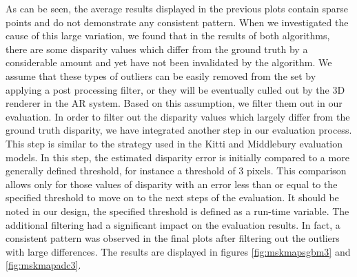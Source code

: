 As can be seen, the average results displayed in the previous plots contain sparse points and 
do not demonstrate any consistent pattern. When we investigated the cause of this large variation, we found that in
the results of both algorithms, there are some disparity values which differ from the ground truth 
by a considerable amount and yet have not been invalidated by the
algorithm. We assume that these types of outliers can be easily removed from the set by applying a post processing filter, or 
they will be eventually culled out by the 3D renderer in the AR system. Based on this assumption, we filter them out in our evaluation.
In order to filter out the disparity values which largely differ from the ground truth disparity, we have integrated another 
step in our evaluation process. This step is similar to the strategy used in the Kitti and Middlebury evaluation models.
In this step, the estimated disparity error is initially compared to a more generally defined threshold, for instance a threshold of 3 pixels.
This comparison allows only for those values of disparity with an error less than or equal to the specified threshold to 
move on to the next steps of the evaluation. It should be noted in our design, the specified threshold is defined as a run-time variable. \newline
The additional filtering had a significant impact on the evaluation results. In fact, a consistent pattern was observed in the final plots after filtering out the
outliers with large differences. The results are displayed in
figures \ref{fig:mskmapsgbm3} and \ref{fig:mskmapadc3}.

